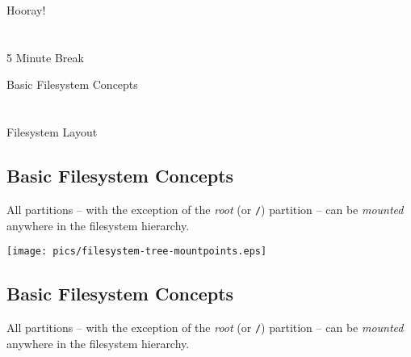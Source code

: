 \documentclass[xga]{xdvislides}
\begin{document}
\newpage
\vspace*{\fill}
\begin{center}
    \Hugesize
        Hooray! \\ [1em]
    \hspace*{5mm}
    \blueline\\
    \hspace*{5mm}\\
        5 Minute Break
\end{center}
\vspace*{\fill}

\newpage
\vspace*{\fill}
\begin{center}
	\Hugesize
		Basic Filesystem Concepts\\ [1em]
	\hspace*{5mm}
	\blueline\\
	\hspace*{5mm}\\
		Filesystem Layout
\end{center}
\vspace*{\fill}

\subsection{Basic Filesystem Concepts}
All partitions -- with the exception of the {\em root} (or \verb+/+) partition
-- can be {\em mounted} anywhere in the filesystem hierarchy.
\\

\begin{center}
	\texttt{[image: pics/filesystem-tree-mountpoints.eps]} \\
\end{center}

%
%
\subsection{Basic Filesystem Concepts}
All partitions -- with the exception of the {\em root} (or \verb+/+) partition
-- can be {\em mounted} anywhere in the filesystem hierarchy.
\\
\end{document}
